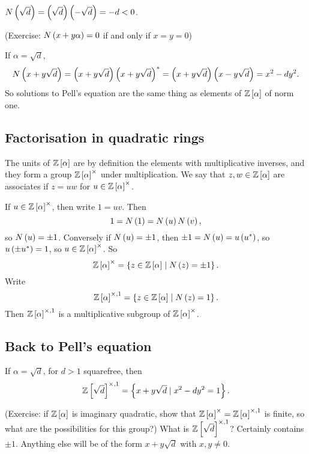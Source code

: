 \begin{example2}
$ N\left( \sqrt{d} \right) = \left( \sqrt{d} \right)\left( -\sqrt{d} \right) = -d < 0 $.
\end{example2}

(Exercise: $ N\left( x + y\alpha \right) = 0 $ if and only if $ x = y = 0 $)

\begin{example2}
If $ \alpha = \sqrt{d} $,
$$ N\left( x + y\sqrt{d} \right) = \left( x + y\sqrt{d} \right)\left( x + y\sqrt{d} \right)^* = \left( x + y\sqrt{d} \right)\left( x - y\sqrt{d} \right) = x^2 - dy^2. $$
So solutions to Pell's equation are the same thing as elements of $ \mathbb{Z}\left[ \alpha \right] $ of norm one.
\end{example2}

\subsection{Factorisation in quadratic rings}

\begin{definition}
The units of $ \mathbb{Z}\left[ \alpha \right] $ are by definition the elements with multiplicative inverses, and they form a group $ \mathbb{Z}\left[ \alpha \right]^\times $ under multiplication. We say that $ z, w \in \mathbb{Z}\left[ \alpha \right] $ are associates if $ z = uw $ for $ u \in \mathbb{Z}\left[ \alpha \right]^\times $.
\end{definition}

If $ u \in \mathbb{Z}\left[ \alpha \right]^\times $, then write $ 1 = uv $. Then
$$ 1 = N\left( 1 \right) = N\left( u \right)N\left( v \right), $$
so $ N\left( u \right) = \pm 1 $. Conversely if $ N\left( u \right) = \pm 1 $, then $ \pm 1 = N\left( u \right) = u\left( u^* \right) $, so $ u\left( \pm u^* \right) = 1 $, so $ u \in \mathbb{Z}\left[ \alpha \right]^\times $. So
$$ \mathbb{Z}\left[ \alpha \right]^\times = \left\{ z \in \mathbb{Z}\left[ \alpha \right] \mid N\left( z \right) = \pm 1 \right\}. $$
Write
$$ \mathbb{Z}\left[ \alpha \right]^{\times, 1} = \left\{ z \in \mathbb{Z}\left[ \alpha \right] \mid N\left( z \right) = 1 \right\}. $$
Then $ \mathbb{Z}\left[ \alpha \right]^{\times, 1} $ is a multiplicative subgroup of $ \mathbb{Z}\left[ \alpha \right]^\times $.

\subsection{Back to Pell's equation}

\begin{example2}
If $ \alpha = \sqrt{d} $, for $ d > 1 $ squarefree, then
$$ \mathbb{Z}\left[ \sqrt{d} \right]^{\times, 1} = \left\{ x + y\sqrt{d} \mid x^2 - dy^2 = 1 \right\}. $$
\end{example2}

(Exercise: if $ \mathbb{Z}\left[ \alpha \right] $ is imaginary quadratic, show that $ \mathbb{Z}\left[ \alpha \right]^\times = \mathbb{Z}\left[ \alpha \right]^{\times, 1} $ is finite, so what are the possibilities for this group?) What is $ \mathbb{Z}\left[ \sqrt{d} \right]^{\times, 1} $? Certainly contains $ \pm 1 $. Anything else will be of the form $ x + y\sqrt{d} $ with $ x, y \ne 0 $.

